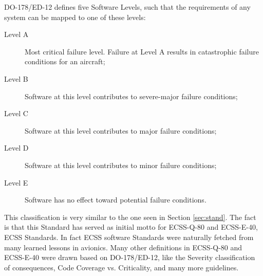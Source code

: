 {DO-178/ED-12 defines five Software Levels\cite{ed-12b}, such that the requirements of any system can be mapped to one
of these levels:
\begin{description}
\item[Level A] Most critical failure level. Failure at Level A results in catastrophic failure conditions for an aircraft;
\item[Level B] Software at this level contributes to severe-major failure conditions;
\item[Level C] Software at this level contributes to major failure conditions;
\item[Level D] Software at this level contributes to minor failure conditions;
\item[Level E] Software has no effect toward potential failure conditions.
\end{description}
This classification is very similar to the one seen in Section \ref{sec:stand}.
The fact is that this Standard has served as initial motto for ECSS-Q-80\cite{ecss-q-st-80c} and ECSS-E-40\cite{ecss-e-st-40c}, \ac{ECSS} Standards.
In fact \ac{ECSS} software Standards were naturally fetched from many learned lessons in avionics.
Many other definitions in ECSS-Q-80\cite{ecss-q-st-80c} and ECSS-E-40\cite{ecss-e-st-40c} were drawn based on DO-178/ED-12, like the
Severity classification of consequences, Code Coverage vs. Criticality, and many more guidelines.

}
